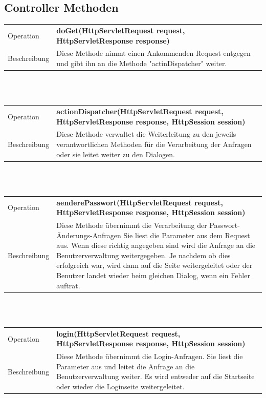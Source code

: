 \documentclass[12pt]{scrreprt}
\begin{document}
\subsection{Controller Methoden}

\begin{tabular}{|lp{12cm}|}
	\hline
	Operation &  \textbf{doGet(HttpServletRequest request, HttpServletResponse response)}\\ 
	Beschreibung & Diese Methode nimmt einen Ankommenden Request entgegen und gibt ihn an die Methode "actinDispatcher" weiter. \\ 
	\hline 
\end{tabular} \\\\

\begin{tabular}{|lp{12cm}|}
	\hline
	Operation &  \textbf{actionDispatcher(HttpServletRequest request, HttpServletResponse response, HttpSession session)}\\ 
	Beschreibung & Diese Methode verwaltet die Weiterleitung zu den jeweils verantwortlichen Methoden für die Verarbeitung der Anfragen oder sie leitet weiter zu den Dialogen. \\ 
	\hline 
\end{tabular} \\\\

\begin{tabular}{|lp{12cm}|}
	\hline
	Operation &  \textbf{aenderePasswort(HttpServletRequest request, HttpServletResponse response, HttpSession session) }\\ 
	Beschreibung & Diese Methode übernimmt die Verarbeitung der Passwort-Änderungs-Anfragen Sie liest die Parameter aus dem Request aus. Wenn diese richtig angegeben sind wird die Anfrage an die Benutzerverwaltung weitergegeben. Je nachdem ob dies erfolgreich war, wird dann auf die Seite weitergeleitet oder der Benutzer landet wieder beim gleichen Dialog, wenn ein Fehler auftrat.\\ 
	\hline 
\end{tabular} \\\\
	
\begin{tabular}{|lp{12cm}|}
	\hline
	Operation &  \textbf{login(HttpServletRequest request, HttpServletResponse response, HttpSession session)}\\ 
	Beschreibung & Diese Methode übernimmt die Login-Anfragen. Sie liest die Parameter aus und leitet die Anfrage an die Benutzerverwaltung weiter. Es wird entweder auf die Startseite oder wieder die Loginseite weitergeleitet. \\ 
	\hline 
\end{tabular} \\\\
\end{document}
